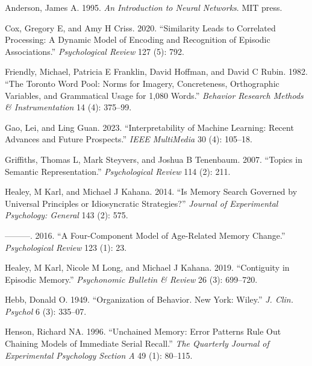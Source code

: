 \documentclass[
  letterpaper,
  11pt,
  english,
  singlespacing,
  headsepline]{MastersDoctoralThesis}
\newlength{\cslhangindent}
\newenvironment{CSLReferences}[2] %
 {\begin{list}{}{%
  \setlength{\itemindent}{0pt}
  \setlength{\leftmargin}{0pt}
  \setlength{\parsep}{0pt}
  \ifodd #1
   \setlength{\leftmargin}{\cslhangindent}
   \setlength{\itemindent}{-1\cslhangindent}
  \fi
  \setlength{\itemsep}{#2\baselineskip}}}
 {\end{list}}
\begin{document}
\label{refs}
\begin{CSLReferences}{1}{0}
Anderson, James A. 1995. \emph{An Introduction to Neural Networks}. MIT
press.

Cox, Gregory E, and Amy H Criss. 2020. {``Similarity Leads to Correlated
Processing: A Dynamic Model of Encoding and Recognition of Episodic
Associations.''} \emph{Psychological Review} 127 (5): 792.

Friendly, Michael, Patricia E Franklin, David Hoffman, and David C
Rubin. 1982. {``The Toronto Word Pool: Norms for Imagery, Concreteness,
Orthographic Variables, and Grammatical Usage for 1,080 Words.''}
\emph{Behavior Research Methods \& Instrumentation} 14 (4): 375--99.

Gao, Lei, and Ling Guan. 2023. {``Interpretability of Machine Learning:
Recent Advances and Future Prospects.''} \emph{IEEE MultiMedia} 30 (4):
105--18.

Griffiths, Thomas L, Mark Steyvers, and Joshua B Tenenbaum. 2007.
{``Topics in Semantic Representation.''} \emph{Psychological Review} 114
(2): 211.

Healey, M Karl, and Michael J Kahana. 2014. {``Is Memory Search Governed
by Universal Principles or Idiosyncratic Strategies?''} \emph{Journal of
Experimental Psychology: General} 143 (2): 575.

---------. 2016. {``A Four-Component Model of Age-Related Memory
Change.''} \emph{Psychological Review} 123 (1): 23.

Healey, M Karl, Nicole M Long, and Michael J Kahana. 2019. {``Contiguity
in Episodic Memory.''} \emph{Psychonomic Bulletin \& Review} 26 (3):
699--720.

Hebb, Donald O. 1949. {``Organization of Behavior. New York: Wiley.''}
\emph{J. Clin. Psychol} 6 (3): 335--07.

Henson, Richard NA. 1996. {``Unchained Memory: Error Patterns Rule Out
Chaining Models of Immediate Serial Recall.''} \emph{The Quarterly
Journal of Experimental Psychology Section A} 49 (1): 80--115.


\end{CSLReferences}
\end{document}
